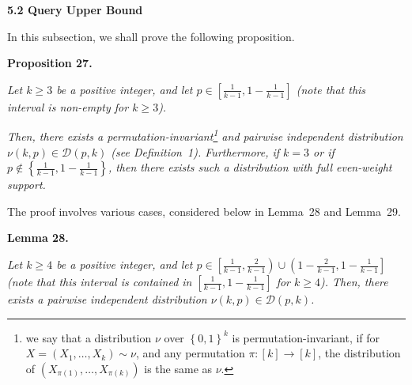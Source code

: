 




\par\medskip\noindent\textbf{
5.2 Query Upper Bound}\par




In this subsection, we shall prove the following proposition.\par





\par\medskip\noindent\textbf{
\textbf{Proposition 27}\textbf{.}
}\par



\emph{Let $k\geqslant 3$ be a positive integer, and let $p\in\left[\frac{1}{k-1},1-\frac{1}{k-1}\right]$ (note that this interval is non-empty for $k\geqslant 3$).}\par




\emph{Then, there exists a permutation-invariant\footnote{we say that a distribution $\nu$ over $\left\{0,1\right\}^{k}$ is permutation-invariant, if for $X=(X_{1},\dots,X_{k})\sim\nu$, and any permutation $\pi:[k]\to[k]$, the distribution of $\left(X_{\pi(1)},\dots,X_{\pi(k)}\right)$ is the same as $\nu$.} and pairwise independent distribution $\nu(k,p)\in\mathcal{D}(p,k)$ (see Definition 1).
Furthermore, if $k=3$ or if $p\not\in\left\{\frac{1}{k-1},1-\frac{1}{k-1}\right\}$, then there exists such a distribution with full even-weight support.}\par






The proof involves various cases, considered below in Lemma 28 and Lemma 29.\par





\par\medskip\noindent\textbf{
\textbf{Lemma 28}\textbf{.}
}\par



\emph{Let $k\geqslant 4$ be a positive integer, and let $p\in\left[\frac{1}{k-1},\frac{2}{k-1}\right)\cup\left(1-\frac{2}{k-1},1-\frac{1}{k-1}\right]$ (note that this interval is contained in $\left[\frac{1}{k-1},1-\frac{1}{k-1}\right]$ for $k\geqslant 4$).
Then, there exists a pairwise independent distribution $\nu(k,p)\in\mathcal{D}(p,k)$.}\par




